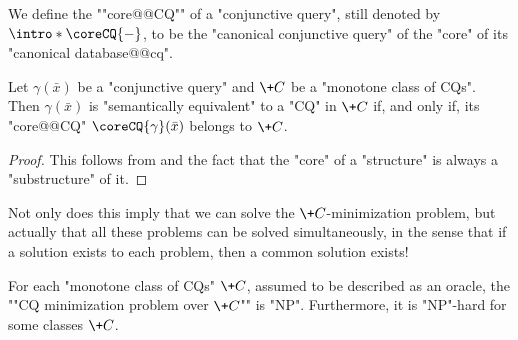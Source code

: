 We define the ""core@@CQ"" of a "conjunctive query", still denoted by $\intro*\coreCQ{-}$,
to be the "canonical conjunctive query" of the "core" of its "canonical database@@cq".
\begin{proposition}
	\AP\label{prop:minimization-CQ}
	Let $\gamma(\bar x)$ be a "conjunctive query" and $\+C$ be
	a "monotone class of CQs". Then $\gamma(\bar x)$ is "semantically equivalent"
	to a "CQ" in $\+C$ if, and only if, its "core@@CQ" $\coreCQ{\gamma}(\bar x)$
	belongs to $\+C$.
\end{proposition}

\begin{proof}
	This follows from 
	and the fact that the "core" of a "structure" is always
	a "substructure" of it.
\end{proof}

Not only does this imply that we can solve the $\+C$-minimization problem,
but actually that all these problems can be solved simultaneously,
in the sense that if a solution exists to each problem, then a common solution exists!


\begin{corollary}
	\label{coro:decision-minimization-cq}
	For each "monotone class of CQs" $\+C$, assumed to be described as an oracle,
	the ""CQ minimization problem over $\+C$"" is "NP".
	Furthermore, it is "NP"-hard for some classes $\+C$.
\end{corollary}

